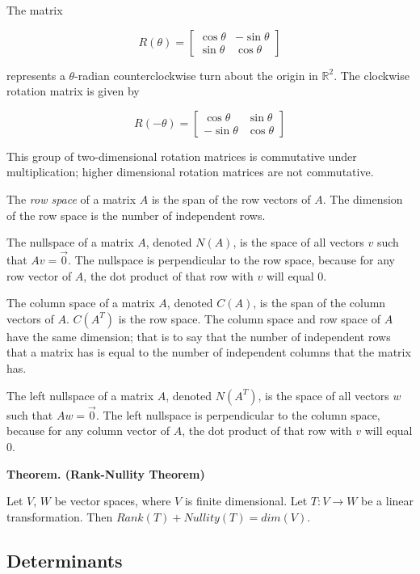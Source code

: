 \documentclass[12pt]{article}
\begin{document}
	The matrix
	
	$$
	R(\theta )
	=
	\begin{bmatrix}
	\cos{\theta} & -\sin{\theta} \\
	\sin{\theta} &  \cos{\theta}
	\end{bmatrix}
	$$
	
	represents a $\theta$-radian counterclockwise turn about the origin in $\mathbb{R}^{2}$. The clockwise rotation matrix is given by
	
	$$
	R(-\theta )
	=
	\begin{bmatrix}
	 \cos{\theta} & \sin{\theta} \\
	-\sin{\theta} & \cos{\theta}
	\end{bmatrix}
	$$
	
	This group of two-dimensional rotation matrices is commutative under multiplication; higher dimensional rotation matrices are not commutative.
	

	The \textit{row space} of a matrix $A$ is the span of the row vectors of $A$. The dimension of the row space is the number of independent rows.
	

	The nullspace of a matrix $A$, denoted $N(A)$, is the space of all vectors $v$ such that $Av=\vec{0}$. The nullspace is perpendicular to the row space, because for any row vector of $A$, the dot product of that row with $v$ will equal $0$.
	
	The column space of a matrix $A$, denoted $C(A)$, is the span of the column vectors of $A$. $C(A^{T})$ is the row space. The column space and row space of $A$ have the same dimension; that is to say that the number of independent rows that a matrix has is equal to the number of independent columns that the matrix has.
	
	The left nullspace of a matrix $A$, denoted $N(A^{T})$, is the space of all vectors $w$ such that $Aw=\vec{0}$. The left nullspace is perpendicular to the column space, because for any column vector of $A$, the dot product of that row with $v$ will equal $0$.
	
	\textbf{Theorem. (Rank-Nullity Theorem)}
	
	Let $V$, $W$ be vector spaces, where $V$ is finite dimensional. Let $T: V \to W$ be a linear transformation. Then $Rank(T) + Nullity(T) = dim(V)$.

	\subsection{Determinants}
	
\end{document}
